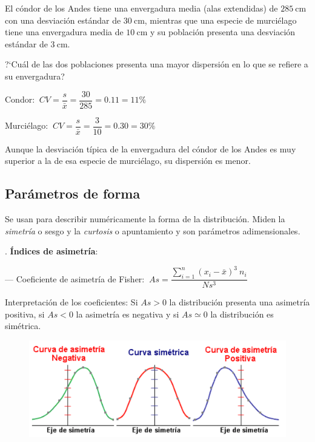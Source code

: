 	
\vspace{5mm}%
\begin{ejemplo}
\begin{ejre} El cóndor de los Andes tiene una envergadura media (alas extendidas) de $285 \ \mathrm{cm}$ con una desviación estándar de $30 \ \mathrm{cm}$, mientras que una especie de murciélago tiene una envergadura media de $10 \ \mathrm{cm}$ y su población presenta una desviación estándar de $3 \ \mathrm{cm}$.

?`Cuál de las dos poblaciones presenta una mayor dispersión en lo que se refiere a su envergadura?	

\vspace{4mm} Condor: $\ CV=\dfrac{s}{\bar x}=\dfrac{30}{285}=0.11=11\%$

Murciélago: $\ CV=\dfrac{s}{\bar x}=\dfrac{3}{10}=0.30=30\%$

Aunque la desviación típica de la envergadura del cóndor de los Andes es muy superior a la de esa especie de murciélago, su dispersión es menor.
\end{ejre}
\end{ejemplo}

\subsection{Parámetros de forma}

Se usan para describir numéricamente la forma de la distribución. Miden la \emph{simetría} o sesgo y la \emph{curtosis} o apuntamiento y son parámetros adimensionales.

\vspace{5mm}%
\begin{definition}
	. \textbf{Índices de asimetría}:
	
	
	\vspace{2mm} --- Coeficiente de asimetría de Fisher: $\ As=\dfrac{\displaystyle \sum_{i=1}^n (x_i-\bar x)^3 \ n_i}{N s^3}$
	
	\vspace{4mm} Interpretación de los coeficientes: Si $As>0$ la distribución presenta una asimetría positiva, si $As<0$ la asimetría es negativa y si $As\simeq 0$ la distribución es simétrica.
	
	\begin{figure}[H]
			\centering
			\includegraphics[width=.75\textwidth]{imagenes/imagenes01/T01IM18.png}
	\end{figure}
\end{definition}

